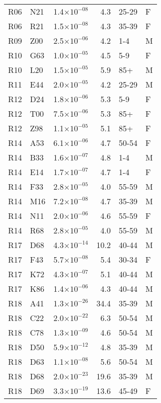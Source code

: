 \begin{longtable}{lllrll}
   R06 & N21 & 1.4$\times10^{-08}$ & 4.3 & 25-29 & F \\ 
   R06 & R21 & 1.5$\times10^{-08}$ & 4.3 & 35-39 & F \\ 
   R09 & Z00 & 2.5$\times10^{-06}$ & 4.2 & 1-4 & M \\ 
   R10 & G63 & 1.0$\times10^{-05}$ & 4.5 & 5-9 & F \\ 
   R10 & L20 & 1.5$\times10^{-05}$ & 5.9 & 85+ & M \\ 
   R11 & E44 & 2.0$\times10^{-05}$ & 4.2 & 25-29 & M \\ 
   R12 & D24 & 1.8$\times10^{-06}$ & 5.3 & 5-9 & F \\ 
   R12 & T00 & 7.5$\times10^{-06}$ & 5.3 & 85+ & F \\ 
   R12 & Z98 & 1.1$\times10^{-05}$ & 5.1 & 85+ & F \\ 
   R14 & A53 & 6.1$\times10^{-06}$ & 4.7 & 50-54 & F \\ 
   R14 & B33 & 1.6$\times10^{-07}$ & 4.8 & 1-4 & M \\ 
   R14 & E14 & 1.7$\times10^{-07}$ & 4.7 & 1-4 & F \\ 
   R14 & F33 & 2.8$\times10^{-05}$ & 4.0 & 55-59 & M \\ 
   R14 & M16 & 7.2$\times10^{-08}$ & 4.7 & 35-39 & M \\ 
   R14 & N11 & 2.0$\times10^{-06}$ & 4.6 & 55-59 & F \\ 
   R14 & R68 & 2.8$\times10^{-05}$ & 4.0 & 55-59 & M \\ 
   R17 & D68 & 4.3$\times10^{-14}$ & 10.2 & 40-44 & M \\ 
   R17 & F43 & 5.7$\times10^{-08}$ & 5.4 & 30-34 & F \\ 
   R17 & K72 & 4.3$\times10^{-07}$ & 5.1 & 40-44 & M \\ 
   R17 & K86 & 1.4$\times10^{-06}$ & 4.3 & 40-44 & M \\ 
   R18 & A41 & 1.3$\times10^{-26}$ & 34.4 & 35-39 & M \\ 
   R18 & C22 & 2.0$\times10^{-22}$ & 6.3 & 50-54 & M \\ 
   R18 & C78 & 1.3$\times10^{-09}$ & 4.6 & 50-54 & M \\ 
   R18 & D50 & 5.9$\times10^{-12}$ & 4.8 & 35-39 & M \\ 
   R18 & D63 & 1.1$\times10^{-08}$ & 5.6 & 50-54 & M \\ 
   R18 & D68 & 2.0$\times10^{-23}$ & 19.6 & 35-39 & M \\ 
   R18 & D69 & 3.3$\times10^{-19}$ & 13.6 & 45-49 & F \\ 

\end{longtable}
